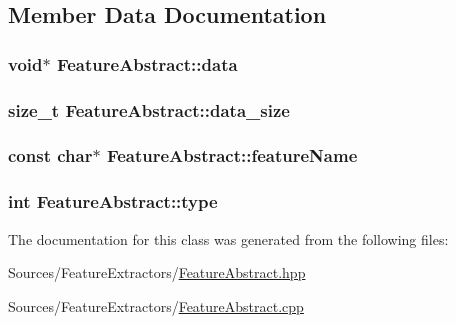 \subsection{Member Data Documentation}
\hypertarget{class_feature_abstract_a088a09441e0d60ad556c37910e51e8a6}{
\subsubsection[{data}]{\setlength{\rightskip}{0pt plus 5cm}void$\ast$ Feature\+Abstract\+::data\hspace{0.3cm}{\ttfamily [protected]}}}\label{class_feature_abstract_a088a09441e0d60ad556c37910e51e8a6}
\hypertarget{class_feature_abstract_a99b0e94ca4cdf08688924517946b5743}{
\subsubsection[{data\+\_\+size}]{\setlength{\rightskip}{0pt plus 5cm}size\+\_\+t Feature\+Abstract\+::data\+\_\+size\hspace{0.3cm}{\ttfamily [protected]}}}\label{class_feature_abstract_a99b0e94ca4cdf08688924517946b5743}
\hypertarget{class_feature_abstract_ae11ff57d87c0e49cf1cf95d71f407979}{
\subsubsection[{feature\+Name}]{\setlength{\rightskip}{0pt plus 5cm}const char$\ast$ Feature\+Abstract\+::feature\+Name\hspace{0.3cm}{\ttfamily [protected]}}}\label{class_feature_abstract_ae11ff57d87c0e49cf1cf95d71f407979}
\hypertarget{class_feature_abstract_acab3574e41f892ae811b4adac8f5840a}{
\subsubsection[{type}]{\setlength{\rightskip}{0pt plus 5cm}int Feature\+Abstract\+::type\hspace{0.3cm}{\ttfamily [protected]}}}\label{class_feature_abstract_acab3574e41f892ae811b4adac8f5840a}


The documentation for this class was generated from the following files\+:\begin{DoxyCompactItemize}
\item 
Sources/\+Feature\+Extractors/\hyperlink{_feature_abstract_8hpp}{Feature\+Abstract.\+hpp}\item 
Sources/\+Feature\+Extractors/\hyperlink{_feature_abstract_8cpp}{Feature\+Abstract.\+cpp}\end{DoxyCompactItemize}
